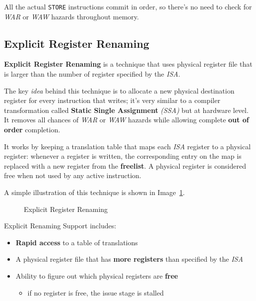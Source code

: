 \documentclass[english]{article}
\begin{document}
All the actual \texttt{STORE} instructions commit in order, so there's no need to check for \textit{WAR} or \textit{WAW} hazards throughout memory.

\subsection{Explicit Register Renaming}

\textbf{Explicit Register Renaming} is a technique that uses physical register file that is larger than the number of register specified by the \textit{ISA}.

The key \textit{idea} behind this technique is to allocate a new physical destination register for every instruction that writes;
it's very similar to a compiler transformation called \textbf{Static Single Assignment} \textit{(SSA)} but at hardware level.
It removes all chances of \textit{WAR} or \textit{WAW} hazards while allowing complete \textbf{out of order} completion.

It works by keeping a translation table that maps each \textit{ISA} register to a physical register:
whenever a register is written, the corresponding entry on the map is replaced with a new register from the \textbf{freelist}.
A physical register is considered free when not used by any active instruction.

A simple illustration of this technique is shown in Image~\ref{fig:explicit-register-renaming}.

\begin{figure}[htbp]
  \bigskip
  \centering
  \caption{Explicit Register Renaming}
  \label{fig:explicit-register-renaming}
  \bigskip
\end{figure}

Explicit Renaming Support includes:

\begin{itemize}
  \item \textbf{Rapid access} to a table of translations
  \item A physical register file that has \textbf{more registers} than specified by the \textit{ISA}
  \item Ability to figure out which physical registers are \textbf{free}
        \begin{itemize}
          \item if no register is free, the issue stage is stalled
        \end{itemize}
\end{itemize}
\end{document}
